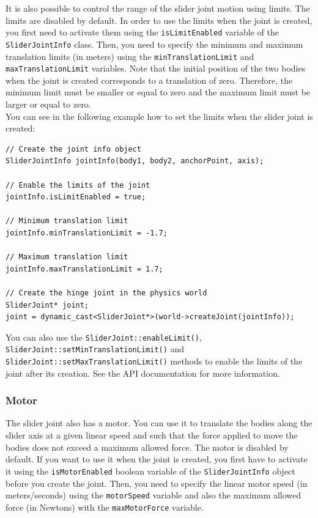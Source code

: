 \documentclass[a4paper,12pt]{article}
\begin{document}
    It is also possible to control the range of the slider joint motion using limits. The limits are disabled by default. In order to use the limits when the joint is created, you first
    need to activate them using the \texttt{isLimitEnabled} variable of the \texttt{SliderJointInfo} class. Then, you need to specify the minimum and maximum translation limits
    (in meters) using the \texttt{minTranslationLimit} and \texttt{maxTranslation\-Limit} variables. Note that the initial position of the two bodies when the joint is created
    corresponds to a translation of zero. Therefore, the minimum limit must be smaller or equal to zero and the maximum limit must be larger or equal to zero. \\

    You can see in the following example how to set the limits when the slider joint is created: \\

    \begin{lstlisting}
// Create the joint info object
SliderJointInfo jointInfo(body1, body2, anchorPoint, axis);

// Enable the limits of the joint
jointInfo.isLimitEnabled = true;

// Minimum translation limit
jointInfo.minTranslationLimit = -1.7;

// Maximum translation limit
jointInfo.maxTranslationLimit = 1.7;

// Create the hinge joint in the physics world
SliderJoint* joint;
joint = dynamic_cast<SliderJoint*>(world->createJoint(jointInfo));
  \end{lstlisting}

    \vspace{0.6cm}

   \begin{sloppypar}
     You can also use the \texttt{SliderJoint::enableLimit()}, \texttt{SliderJoint::\-setMinTranslationLimit()} and \texttt{SliderJoint::setMaxTranslationLimit()} methods to
     enable the limits of the joint after its creation. See the API documentation for more information.
    \end{sloppypar}

    \subsubsection{Motor}

     The slider joint also has a motor. You can use it to translate the bodies along the slider axis at a given linear speed and such that the force applied to
     move the bodies does not exceed a maximum allowed force. The motor is disabled by default. If you want to use it when the joint is created, you first have to activate it using the
     \texttt{isMotorEnabled} boolean variable of the \texttt{SliderJointInfo} object before you create the joint. Then, you need to specify the linear motor speed (in meters/seconds)
     using the \texttt{motorSpeed} variable and also the maximum allowed force (in Newtons) with the \texttt{maxMotorForce} variable. \\
\end{document}
